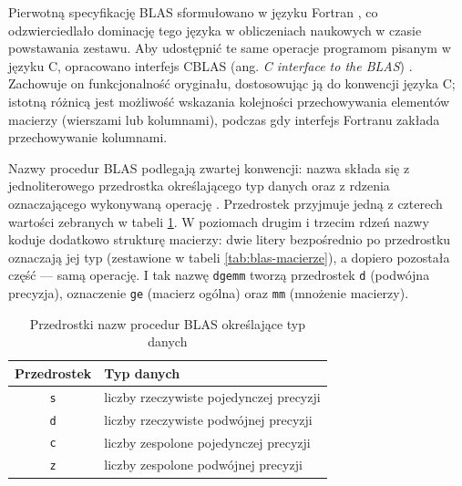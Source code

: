 \documentclass[a4paper,12pt]{book} %
\begin{document}
Pierwotną specyfikację BLAS sformułowano w języku Fortran \cite{blackford2002blas}, co odzwierciedlało dominację tego języka w obliczeniach naukowych w czasie powstawania zestawu. Aby udostępnić te same operacje programom pisanym w języku C, opracowano interfejs CBLAS (ang. \emph{C interface to the BLAS}) \cite{netlib_blas}. Zachowuje on funkcjonalność oryginału, dostosowując ją do konwencji języka C; istotną różnicą jest możliwość wskazania kolejności przechowywania elementów macierzy (wierszami lub kolumnami), podczas gdy interfejs Fortranu zakłada przechowywanie kolumnami.

Nazwy procedur BLAS podlegają zwartej konwencji: nazwa składa się z jednoliterowego przedrostka określającego typ danych oraz z rdzenia oznaczającego wykonywaną operację \cite{blackford2002blas}. Przedrostek przyjmuje jedną z czterech wartości zebranych w tabeli \ref{tab:blas-typy}. W poziomach drugim i trzecim rdzeń nazwy koduje dodatkowo strukturę macierzy: dwie litery bezpośrednio po przedrostku oznaczają jej typ (zestawione w tabeli \ref{tab:blas-macierze}), a dopiero pozostała część --- samą operację. I tak nazwę \texttt{dgemm} tworzą przedrostek \texttt{d} (podwójna precyzja), oznaczenie \texttt{ge} (macierz ogólna) oraz \texttt{mm} (mnożenie macierzy).

\begin{table}[t!]
\centering
\caption{Przedrostki nazw procedur BLAS określające typ danych}
\label{tab:blas-typy}
\begin{tabular}{cl}
\hline
Przedrostek & Typ danych \\
\hline
\texttt{s} & liczby rzeczywiste pojedynczej precyzji \\
\texttt{d} & liczby rzeczywiste podwójnej precyzji \\
\texttt{c} & liczby zespolone pojedynczej precyzji \\
\texttt{z} & liczby zespolone podwójnej precyzji \\
\hline
\end{tabular}
\end{table}
\end{document}
